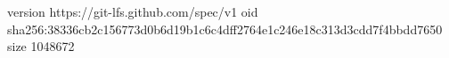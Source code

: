 version https://git-lfs.github.com/spec/v1
oid sha256:38336cb2c156773d0b6d19b1c6c4dff2764e1c246e18c313d3cdd7f4bbdd7650
size 1048672
